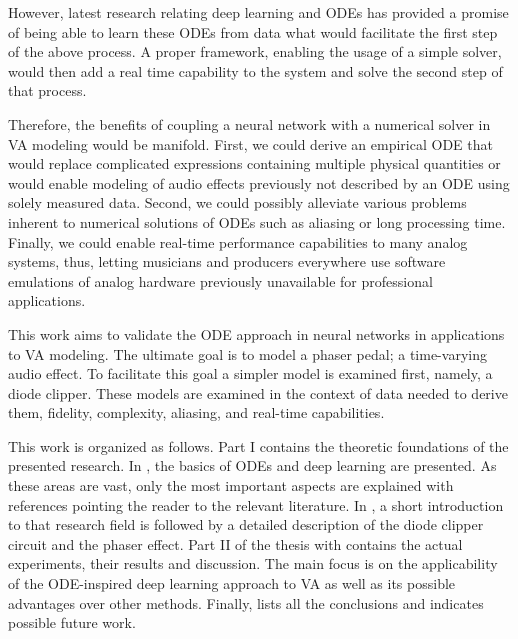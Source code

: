 However, latest research relating deep learning and \acp{ODE} has provided a promise of being able to learn these \acp{ODE} from data what would facilitate the first step of the above process. A proper framework, enabling the usage of a simple solver, would then add a real time capability to the system and solve the second step of that process.

Therefore, the benefits of coupling a neural network with a numerical solver in \ac{VA} modeling would be manifold. First, we could derive an empirical \ac{ODE} that would replace complicated expressions containing multiple physical quantities or would enable modeling of audio effects previously not described by an \ac{ODE} using solely measured data. Second, we could possibly alleviate various problems inherent to numerical solutions of \acp{ODE} such as aliasing or long processing time. Finally, we could enable real-time performance capabilities to many analog systems, thus, letting musicians and producers everywhere use software emulations of analog hardware previously unavailable for professional applications.

This work aims to validate the \ac{ODE} approach in neural networks in applications to \ac{VA} modeling. The ultimate goal is to model a phaser pedal; a time-varying audio effect. To facilitate this goal a simpler model is examined first, namely, a diode clipper. These models are examined in the context of data needed to derive them, fidelity, complexity, aliasing, and real-time capabilities.

This work is organized as follows. Part I contains the theoretic foundations of the presented research. In , the basics of \acp{ODE} and deep learning are presented. As these areas are vast, only the most important aspects are explained with references pointing the reader to the relevant literature. In , a short introduction to that research field is followed by a detailed description of the diode clipper circuit and the phaser effect. Part II of the thesis with  contains the actual experiments, their results and discussion. The main focus is on the applicability of the \ac{ODE}-inspired deep learning approach to \ac{VA} as well as its possible advantages over other methods. Finally,  lists all the conclusions and indicates possible future work.

